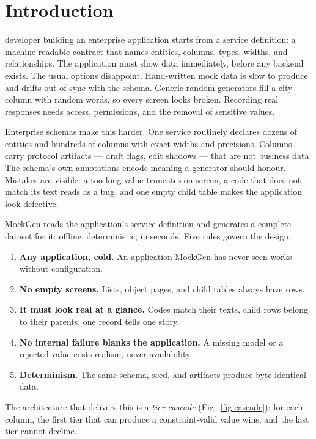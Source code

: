 \documentclass[journal]{IEEEtran}
\newcommand{\system}{MockGen}
\begin{document}
\section{Introduction}
\label{sec:intro}

 developer building an enterprise application
starts from a service definition: a machine-readable contract that names
entities, columns, types, widths, and relationships. The application
must show data immediately, before any backend exists. The usual options
disappoint. Hand-written mock data is slow to produce and drifts out of
sync with the schema. Generic random generators fill a city column with
random words, so every screen looks broken. Recording real responses
needs access, permissions, and the removal of sensitive values.

Enterprise schemas make this harder. One service routinely declares
dozens of entities and hundreds of columns with exact widths and
precisions. Columns carry protocol artifacts --- draft flags, edit
shadows --- that are not business data. The schema's own annotations
encode meaning a generator should honour. Mistakes are visible: a
too-long value truncates on screen, a code that does not match its text
reads as a bug, and one empty child table makes the application look
defective.

\system{} reads the application's service definition and generates a
complete dataset for it: offline, deterministic, in seconds. Five rules
govern the design.

\begin{enumerate}
  \item \textbf{Any application, cold.} An application \system{} has
    never seen works without configuration.
  \item \textbf{No empty screens.} Lists, object pages, and child tables
    always have rows.
  \item \textbf{It must look real at a glance.} Codes match their texts,
    child rows belong to their parents, one record tells one story.
  \item \textbf{No internal failure blanks the application.} A missing
    model or a rejected value costs realism, never availability.
  \item \textbf{Determinism.} The same schema, seed, and artifacts
    produce byte-identical data.
\end{enumerate}

The architecture that delivers this is a \emph{tier cascade}
(Fig.~\ref{fig:cascade}): for each column, the first tier that can
produce a constraint-valid value wins, and the last tier cannot decline.
\end{document}

